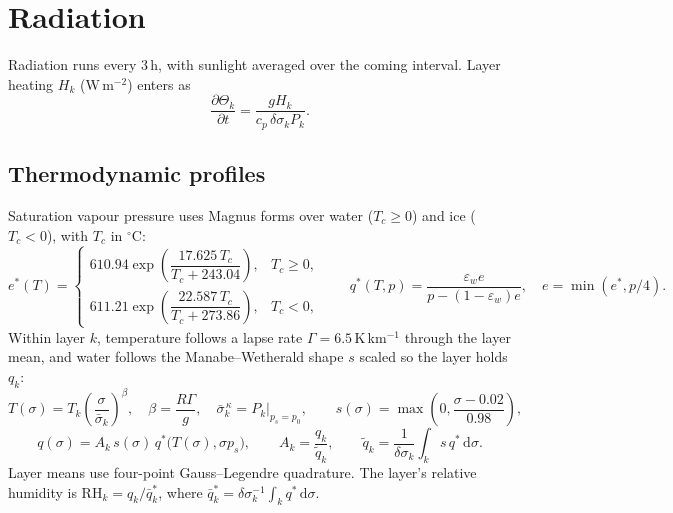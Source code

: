\documentclass[11pt,a4paper]{article}
\newcommand{\dd}{\mathrm{d}}
\newcommand{\pd}[2]{\frac{\partial #1}{\partial #2}}
\begin{document}
\section{Radiation}

Radiation runs every 3\,h, with sunlight averaged over the coming interval. Layer
heating $H_k$ (W\,m$^{-2}$) enters as
\begin{equation}
\pd{\Theta_k}{t} = \frac{g H_k}{c_p\,\delta\sigma_k P_k}.
\end{equation}

\subsection{Thermodynamic profiles}\label{sec:humidity-profile}
Saturation vapour pressure uses Magnus forms over water ($T_c \ge 0$) and ice
($T_c < 0$), with $T_c$ in $^\circ$C:
\begin{equation}
e^*(T) = \begin{cases}
610.94\exp\!\left(\dfrac{17.625\,T_c}{T_c + 243.04}\right), & T_c \ge 0,\\[2ex]
611.21\exp\!\left(\dfrac{22.587\,T_c}{T_c + 273.86}\right), & T_c < 0,
\end{cases}
\qquad
q^*(T,p) = \frac{\varepsilon_w e}{p - (1-\varepsilon_w)e}, \quad e = \min(e^*, p/4).
\end{equation}
Within layer $k$, temperature follows a lapse rate $\Gamma = 6.5$\,K\,km$^{-1}$
through the layer mean, and water follows the Manabe--Wetherald shape $s$ scaled so
the layer holds $q_k$:
\begin{equation}
T(\sigma) = T_k\left(\frac{\sigma}{\bar\sigma_k}\right)^{\beta}, \quad
\beta = \frac{R\Gamma}{g}, \quad
\bar\sigma_k^{\,\kappa} = P_k\big|_{p_s = p_0}, \qquad
s(\sigma) = \max\!\left(0, \frac{\sigma - 0.02}{0.98}\right),
\end{equation}
\begin{equation}
q(\sigma) = A_k\,s(\sigma)\,q^*\bigl(T(\sigma), \sigma p_s\bigr), \qquad
A_k = \frac{q_k}{\tilde q_k}, \qquad
\tilde q_k = \frac{1}{\delta\sigma_k}\int_k s\,q^*\,\dd\sigma .
\end{equation}
Layer means use four-point Gauss--Legendre quadrature. The layer's relative
humidity is $\mathrm{RH}_k = q_k/\bar q^*_k$, where
$\bar q^*_k = \delta\sigma_k^{-1}\int_k q^*\,\dd\sigma$.
\end{document}

